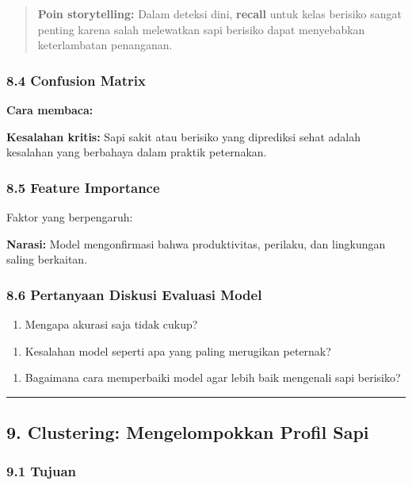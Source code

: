 \documentclass[12pt,a4paper]{article}
\begin{document}
\begin{quote}
\textbf{Poin storytelling:} Dalam deteksi dini, \textbf{recall} untuk kelas berisiko sangat penting karena salah melewatkan sapi berisiko dapat menyebabkan keterlambatan penanganan.\end{quote}


\subsubsection{8.4 Confusion Matrix}

\textbf{Cara membaca:}


\textbf{Kesalahan kritis:} Sapi sakit atau berisiko yang diprediksi sehat adalah kesalahan yang berbahaya dalam praktik peternakan.


\subsubsection{8.5 Feature Importance}

Faktor yang berpengaruh:


\textbf{Narasi:} Model mengonfirmasi bahwa produktivitas, perilaku, dan lingkungan saling berkaitan.


\subsubsection{8.6 Pertanyaan Diskusi Evaluasi Model}

\begin{enumerate}
\item Mengapa akurasi saja tidak cukup?
\end{enumerate}

\begin{enumerate}
\item Kesalahan model seperti apa yang paling merugikan peternak?
\end{enumerate}

\begin{enumerate}
\item Bagaimana cara memperbaiki model agar lebih baik mengenali sapi berisiko?
\end{enumerate}


\hrule


\subsection{9. Clustering: Mengelompokkan Profil Sapi}

\subsubsection{9.1 Tujuan}
\end{document}
